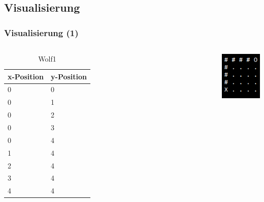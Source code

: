\documentclass{beamer}
\begin{document}
\subsection{Visualisierung}
\begin{frame}
\frametitle{Visualisierung (1)}
\begin{columns}[c] %

\begin{table}
\begin{tabular}{l l}
\toprule
\textbf{x-Position} & \textbf{y-Position}\\
\midrule
 0 & 0 \\
0 & 1 \\
0 & 2 \\
0 & 3 \\
0 & 4 \\
1 & 4 \\
2 & 4 \\
3 & 4 \\
4 & 4 \\
\bottomrule
\end{tabular}
\caption{Wolf1}
\end{table}

\includegraphics[scale=1]{wolf_route_bsp.png}
\end{columns}

\end{frame}
\end{document}
